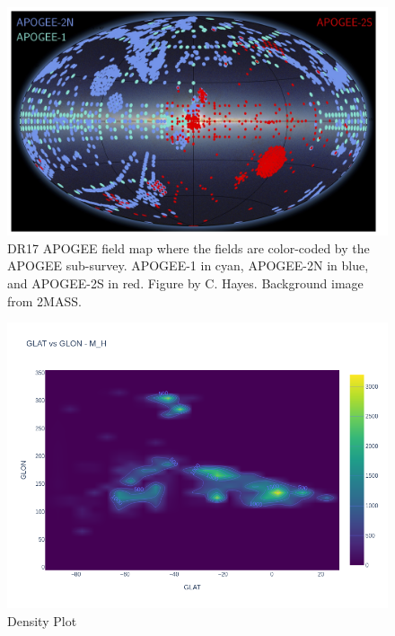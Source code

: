 \documentclass{article}
\begin{document}
\begin{figure}[H]
   \centering
   \label{fig:2}
   \includegraphics[width=\textwidth]{Images/ApogeeCoverage.jpg}
   \caption{DR17 APOGEE field map where the fields are color-coded by the APOGEE sub-survey. APOGEE-1 in cyan, APOGEE-2N in blue, and APOGEE-2S in red. Figure by C. Hayes. Background image from 2MASS.}
\end{figure}
\begin{figure}[H]
    \centering
    \label{fig:3}
    \includegraphics[width=\textwidth]{Images/GLAT vs GLON - Density.png}
    \caption{Density Plot}
\end{figure}

\end{document}
